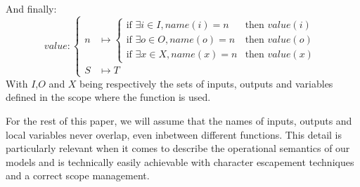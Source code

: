 \documentclass{article}
\begin{document}
And finally:
\begin{equation*}
value :
\begin{cases}
n           &\longmapsto 
    \begin{cases}
        \text{if }\exists i \in I, name(i) = n &\text{then } value(i)\\
        \text{if }\exists o \in O, name(o) = n &\text{then } value(o)\\
        \text{if }\exists x \in X, name(x) = n &\text{then } value(x)
    \end{cases} \\
S           &\longmapsto T
\end{cases}
\end{equation*}
With $I$,$O$ and $X$ being respectively the sets of inputs, outputs and variables defined in the scope where the function is used.

For the rest of this paper, we will assume that the names of inputs, outputs and local variables never overlap, even inbetween different functions. This detail is particularly relevant when it comes to describe the operational semantics of our models and is technically easily achievable with character escapement techniques and a correct scope management.
\end{document}
